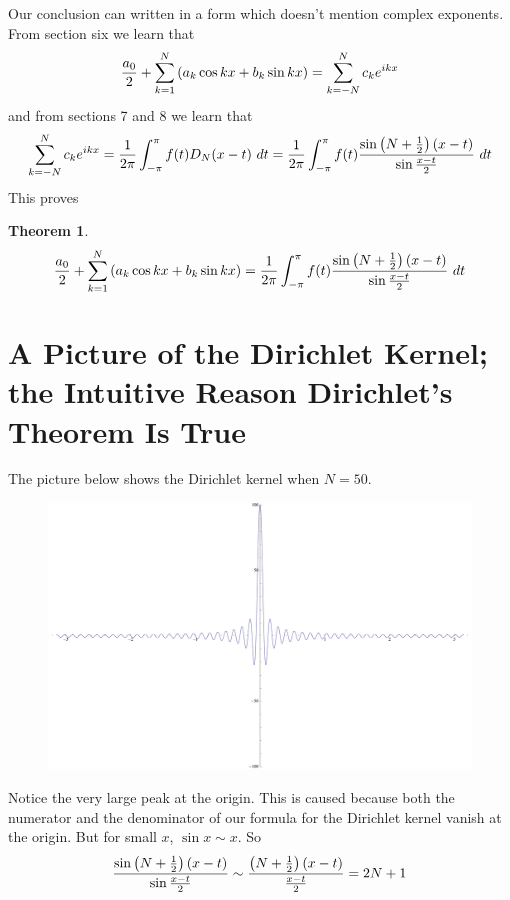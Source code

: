\documentclass[11pt, oneside]{article}   	%
\newtheorem{theorem}{Theorem}
\begin{document}
Our conclusion can written in a form which doesn't mention complex exponents. From section six we learn that
\[{{a_0} \over 2} + \sum_{k = 1}^N \left( a_k \cos kx + b_k \sin kx \right) = \sum_{k = -N}^N c_k e^{ikx}\]
and from sections 7 and 8 we learn that
\[\sum_{k = -N}^N c_k e^{ikx} = {1 \over {2 \pi}} \int_{- \pi}^\pi f(t) D_N(x - t) \ dt =  {1 \over {2 \pi}} \int_{- \pi}^\pi f(t) {{\sin \left(N + {1 \over 2}\right)(x - t)} \over {\sin {{x - t} \over 2}}} \ dt \]
This proves 
\begin{theorem}
\[{{a_0} \over 2} + \sum_{k = 1}^N \left( a_k \cos kx + b_k \sin kx \right) =  {1 \over {2 \pi}} \int_{- \pi}^\pi f(t) {{\sin \left(N + {1 \over 2}\right)(x - t)} \over {\sin {{x - t} \over 2}}} \ dt \]
\end{theorem}

\section{A Picture of the Dirichlet Kernel; the Intuitive Reason Dirichlet's Theorem Is True}

The picture below shows the Dirichlet kernel when $N = 50$. 

\begin{figure}[htbp] %
   \centering
   \includegraphics[width=5in]{Graphics/four}
\end{figure}

Notice the very large peak at the origin. This is caused because both the numerator and the denominator of our formula for the Dirichlet kernel vanish at the origin. But for small $x$, $\sin x \sim x$. So 
\[{{\sin \left( N + {1 \over 2} \right) (x - t)} \over {\sin {{x - t} \over 2}}} \sim {{\left( N + {1 \over 2} \right) (x - t)} \over { {{x - t} \over 2}}}= 2N + 1\]
\end{document}
